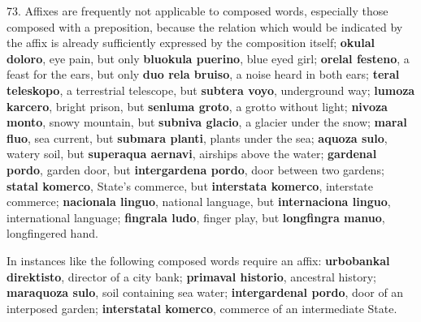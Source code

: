 73. Affixes are frequently not applicable to composed words, especially those composed with a preposition, because the relation which would be indicated by the affix is already sufficiently expressed by the composition itself; \textbf{okulal doloro}, eye pain, but only \textbf{bluokula puerino}, blue eyed girl; \textbf{orelal festeno}, a feast for the ears, but only \textbf{duo rela bruiso}, a noise heard in both ears; \textbf{teral teleskopo}, a terrestrial telescope, but \textbf{subtera voyo}, underground way; \textbf{lumoza karcero}, bright prison, but \textbf{senluma groto}, a grotto without light; \textbf{nivoza monto}, snowy mountain, but \textbf{subniva glacio}, a glacier under the snow; \textbf{maral fluo}, sea current, but \textbf{submara planti}, plants under the sea; \textbf{aquoza sulo}, watery soil, but \textbf{superaqua aernavi}, airships above the water; \textbf{gardenal pordo}, garden door, but \textbf{intergardena pordo}, door between two gardens; \textbf{statal komerco}, State’s commerce, but \textbf{interstata komerco}, interstate commerce; \textbf{nacionala linguo}, national language, but \textbf{internaciona linguo}, international language; \textbf{fingrala ludo}, finger play, but \textbf{longfingra manuo}, longfingered hand.

In instances like the following composed words require an affix: \textbf{urbobankal direktisto}, director of a city bank; \textbf{primaval historio}, ancestral history; \textbf{maraquoza sulo}, soil containing sea water; \textbf{intergardenal pordo}, door of an interposed garden; \textbf{interstatal komerco}, commerce of an intermediate State. 

